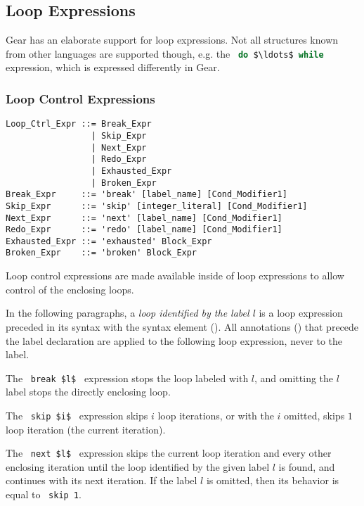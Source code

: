 \subsection{Loop Expressions}

Gear has an elaborate support for loop expressions. Not all structures known from other languages are supported though, e.g. the ~\lstinline[language=Java]!do $\ldots$ while!~ expression, which is expressed differently in Gear. 






\subsubsection{Loop Control Expressions}
\label{sec:loop-control-expressions}

\syntax\begin{lstlisting}
Loop_Ctrl_Expr ::= Break_Expr
                 | Skip_Expr
                 | Next_Expr
                 | Redo_Expr
                 | Exhausted_Expr
                 | Broken_Expr
Break_Expr     ::= 'break' [label_name] [Cond_Modifier1]
Skip_Expr      ::= 'skip' [integer_literal] [Cond_Modifier1]
Next_Expr      ::= 'next' [label_name] [Cond_Modifier1]
Redo_Expr      ::= 'redo' [label_name] [Cond_Modifier1]
Exhausted_Expr ::= 'exhausted' Block_Expr
Broken_Expr    ::= 'broken' Block_Expr
\end{lstlisting}

Loop control expressions are made available inside of loop expressions to allow control of the enclosing loops.

In the following paragraphs, a {\em loop identified by the label $l$} is a loop expression preceded in its syntax with the syntax element  (). All annotations () that precede the label declaration are applied to the following loop expression, never to the label. 

The ~\lstinline!break $l$!~ expression stops the loop labeled with $l$, and omitting the $l$ label stops the directly enclosing loop. 

The ~\lstinline!skip $i$!~ expression skips $i$ loop iterations, or with the $i$ omitted, skips $1$ loop iteration (the current iteration). 

The ~\lstinline!next $l$!~ expression skips the current loop iteration and every other enclosing iteration until the loop identified by the given label $l$ is found, and continues with its next iteration. If the label $l$ is omitted, then its behavior is equal to ~\lstinline!skip 1!. 

